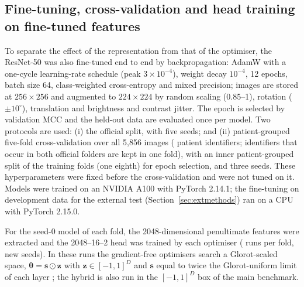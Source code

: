 \documentclass[preprint,12pt]{elsarticle}
\begin{document}
\subsection{Fine-tuning, cross-validation and head training on fine-tuned features}\label{sec:ftmethods}
To separate the effect of the representation from that of the optimiser, the ResNet-50 was also fine-tuned end to end by backpropagation: AdamW \citep{loshchilov2019adamw} with a one-cycle learning-rate schedule (peak $3\times10^{-4}$), weight decay $10^{-4}$, 12 epochs, batch size 64, class-weighted cross-entropy and mixed precision; images are stored at $256\times256$ and augmented to $224\times224$ by random scaling (0.85--1), rotation ($\pm10^{\circ}$), translation and brightness and contrast jitter. The epoch is selected by validation MCC and the held-out data are evaluated once per model. Two protocols are used: (i) the official split, with five seeds; and (ii) patient-grouped five-fold cross-validation over all 5,856 images (\CvPatients{} patient identifiers; identifiers that occur in both official folders are kept in one fold), with an inner patient-grouped split of the training folds (one eighth) for epoch selection, and three seeds. These hyperparameters were fixed before the cross-validation and were not tuned on it. Models were trained on an NVIDIA A100 with PyTorch 2.14.1; the fine-tuning on development data for the external test (Section~\ref{sec:extmethods}) ran on a CPU with PyTorch 2.15.0.

For the seed-0 model of each fold, the 2048-dimensional penultimate features were extracted and the 2048--16--2 head was trained by each optimiser (\CvHeadRuns{} runs per fold, new seeds). In these runs the gradient-free optimisers search a Glorot-scaled space, $\bm\theta=\mathbf{s}\odot\mathbf{z}$ with $\mathbf{z}\in[-1,1]^D$ and $\mathbf{s}$ equal to twice the Glorot-uniform limit of each layer \citep{glorot2010}; the hybrid is also run in the $[-1,1]^D$ box of the main benchmark.
\end{document}
